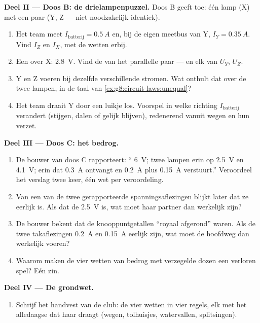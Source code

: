 \begin{problem}
\medskip\noindent\textbf{Deel II --- Doos B: de drielampenpuzzel.}
Doos B geeft toe: één lamp (X)  met een  paar
(Y, Z --- niet noodzakelijk identiek).
\begin{enumerate}[resume]
  \item Het team meet $I_{\text{batterij}} = \qty{0.5}{A}$ en, bij
        de eigen meetbus van Y, $I_Y = \qty{0.35}{A}$. Vind $I_Z$ en
        $I_X$, met de wetten erbij.
  \item Een  over X: \qty{2.8}{V}. Vind de
         van het parallelle paar --- en elk van $U_Y$,
        $U_Z$.
  \item Y en Z voeren bij dezelfde  verschillende
        stromen. Wat onthult dat over de twee lampen, in de taal van
        \cref{ex:g8:circuit-laws:unequal}?
  \item Het team draait Y door een luikje los. Voorspel in welke
        richting $I_{\text{batterij}}$ verandert (stijgen, dalen of
        gelijk blijven), redenerend vanuit wegen en hun verzet.
\end{enumerate}

\medskip\noindent\textbf{Deel III --- Doos C: het bedrog.}
\begin{enumerate}[resume]
  \item De bouwer van doos C rapporteert: ``
        \qty{6}{V}; twee lampen  erin op \qty{2.5}{V} en
        \qty{4.1}{V};  erin dat \qty{0.3}{A} ontvangt
        en \qty{0.2}{A} plus \qty{0.15}{A} verstuurt.'' Veroordeel het
        verslag twee keer, één wet per veroordeling.
  \item Van een van de twee gerapporteerde
        spanningsaflezingen blijkt later dat ze eerlijk is. Als
        dat de \qty{2.5}{V} is, wat moet haar partner dan werkelijk
        zijn?
  \item De bouwer bekent dat de knooppuntgetallen ``royaal afgerond''
        waren. Als de twee takaflezingen \qty{0.2}{A} en
        \qty{0.15}{A} eerlijk zijn, wat moet de hoofdweg dan
        werkelijk voeren?
  \item Waarom maken de vier wetten van bedrog met verzegelde dozen
        een verloren spel? Eén zin.
\end{enumerate}

\medskip\noindent\textbf{Deel IV --- De grondwet.}
\begin{enumerate}[resume]
  \item Schrijf het handvest van de club: de vier wetten in vier
        regels, elk met het alledaagse  dat haar draagt
        (wegen, tolhuisjes, watervallen, splitsingen).
\end{enumerate}
\end{problem}
